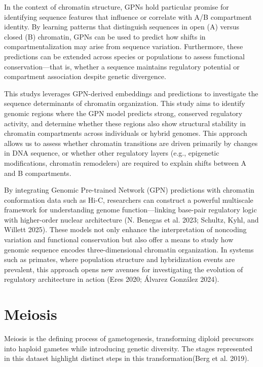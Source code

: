 \documentclass[
  a4paper,
  openany]{scrbook}
\begin{document}
In the context of chromatin structure, GPNs hold particular promise for
identifying sequence features that influence or correlate with A/B
compartment identity. By learning patterns that distinguish sequences in
open (A) versus closed (B) chromatin, GPNs can be used to predict how
shifts in compartmentalization may arise from sequence variation.
Furthermore, these predictions can be extended across species or
populations to assess functional conservation---that is, whether a
sequence maintains regulatory potential or compartment association
despite genetic divergence.

This studys leverages GPN-derived embeddings and predictions to
investigate the sequence determinants of chromatin organization. This
study aims to identify genomic regions where the GPN model predicts
strong, conserved regulatory activity, and determine whether these
regions also show structural stability in chromatin compartments across
individuals or hybrid genomes. This approach allows us to assess whether
chromatin transitions are driven primarily by changes in DNA sequence,
or whether other regulatory layers (e.g., epigenetic modifications,
chromatin remodelers) are required to explain shifts between A and B
compartments.

By integrating Genomic Pre-trained Network (GPN) predictions with
chromatin conformation data such as Hi-C, researchers can construct a
powerful multiscale framework for understanding genome
function---linking base-pair regulatory logic with higher-order nuclear
architecture (N. Benegas et al. 2023; Schultz, Kyhl, and Willett 2025).
These models not only enhance the interpretation of noncoding variation
and functional conservation but also offer a means to study how genomic
sequence encodes three-dimensional chromatin organization. In systems
such as primates, where population structure and hybridization events
are prevalent, this approach opens new avenues for investigating the
evolution of regulatory architecture in action (Eres 2020; Álvarez
González 2024).

\section{Meiosis}\label{meiosis}

Meiosis is the defining process of gametogenesis, transforming diploid
precursors into haploid gametes while introducing genetic diversity. The
stages represented in this dataset highlight distinct steps in this
transformation(Berg et al. 2019).
\end{document}
